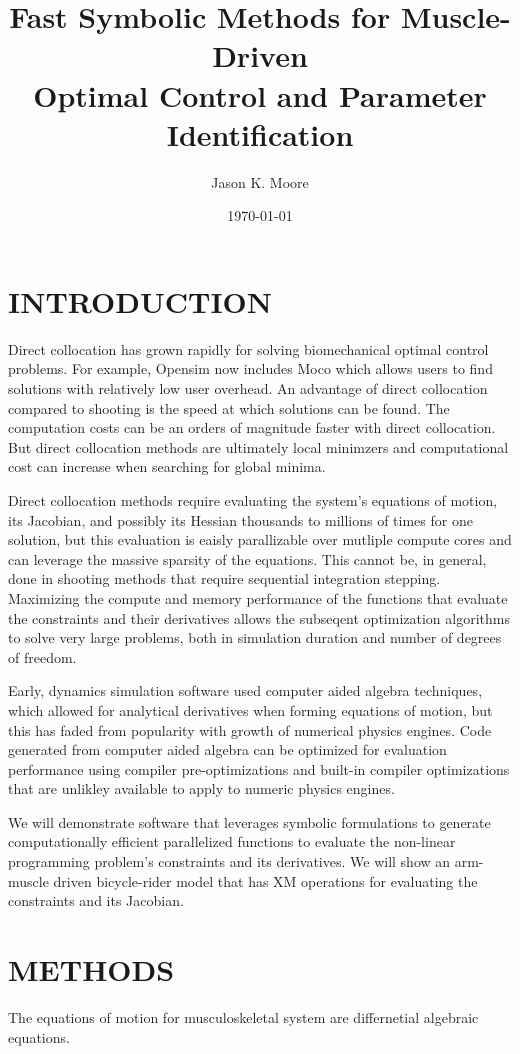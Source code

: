 \documentclass[11pt,twocolumn]{article}
\title{Fast Symbolic Methods for Muscle-Driven\\Optimal Control and Parameter
Identification}
\author{Jason K. Moore}
\date{\today}
\begin{document}
\maketitle
\section*{INTRODUCTION}
%
Direct collocation has grown rapidly for solving biomechanical optimal control
problems. For example, Opensim now includes Moco which allows users to find
solutions with relatively low user overhead. An advantage of direct collocation
compared to shooting is the speed at which solutions can be found.  The
computation costs can be an orders of magnitude faster with direct collocation.
But direct collocation methods are ultimately local minimzers and computational
cost can increase when searching for global minima.

Direct collocation methods require evaluating the system's equations of motion,
its Jacobian, and possibly its Hessian thousands to millions of times for one
solution, but this evaluation is eaisly parallizable over mutliple compute
cores and can leverage the massive sparsity of the equations. This cannot be,
in general, done in shooting methods that require sequential integration
stepping. Maximizing the compute and memory performance of the functions that
evaluate the constraints and their derivatives allows the subseqent optimization
algorithms to solve very large problems, both in simulation duration and number
of degrees of freedom.

Early, dynamics simulation software used computer aided algebra techniques,
which allowed for analytical derivatives when forming equations of motion, but
this has faded from popularity with growth of numerical physics engines. Code
generated from computer aided algebra can be optimized for evaluation
performance using compiler pre-optimizations and built-in compiler
optimizations that are unlikley available to apply to numeric physics engines.

We will demonstrate software that leverages symbolic formulations to generate
computationally efficient parallelized functions to evaluate the non-linear
programming problem's constraints and its derivatives. We will show an
arm-muscle driven bicycle-rider model that has XM operations for evaluating the
constraints and its Jacobian.

\section*{METHODS}
%
The equations of motion for musculoskeletal system are differnetial algebraic
equations.
\end{document}
